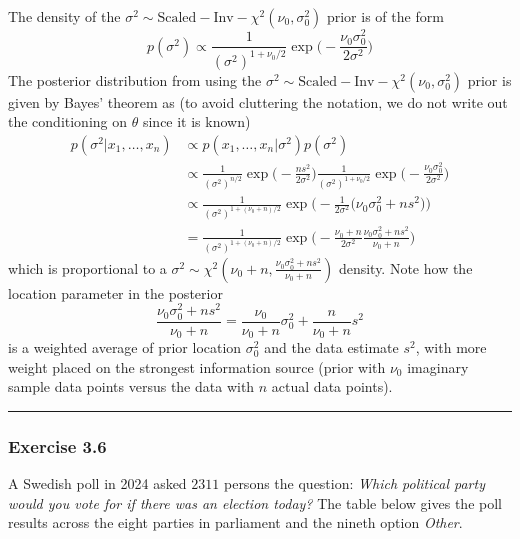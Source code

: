 \documentclass[
  letterpaper,
  DIV=11,
  numbers=noendperiod]{scrartcl}
\begin{document}
\begin{tcolorbox}
The density of the
\(\sigma^2 \sim \mathrm{Scaled-Inv-}\chi^2(\nu_0,\sigma_0^2)\) prior is
of the form \[
p(\sigma^2) \propto \frac{1}{(\sigma^2)^{1+\nu_0/2}}\exp\Big( -\frac{\nu_0\sigma_0^2}{2\sigma^2} \Big)
\] The posterior distribution from using the
\(\sigma^2 \sim \mathrm{Scaled-Inv-}\chi^2(\nu_0,\sigma_0^2)\) prior is
given by Bayes' theorem as (to avoid cluttering the notation, we do not
write out the conditioning on \(\theta\) since it is known) \[
\begin{aligned}
p(\sigma^2 \vert x_1,\ldots,x_n) &\propto 
p(x_1,\ldots,x_n \vert \sigma^2)p(\sigma^2) \\
& \propto  \frac{1}{(\sigma^2)^{n/2}}\exp\Big( -\frac{n s^2}{2\sigma^2}\Big) 
\frac{1}{(\sigma^2)^{1+\nu_0/2}}\exp\Big( -\frac{\nu_0\sigma_0^2}{2\sigma^2} \Big) \\
&\propto \frac{1}{(\sigma^2)^{1+(\nu_0+n)/2}}\exp\Big( -\frac{1}{2\sigma^2}\big( \nu_0 \sigma_0^2 + n s^2 \big)  \Big) \\
&=  \frac{1}{(\sigma^2)^{1+(\nu_0+n)/2}}\exp\Big( -\frac{\nu_0+n}{2\sigma^2}\frac{\nu_0 \sigma_0^2 + n s^2 }{\nu_0+n}  \Big)
\end{aligned}
\] which is proportional to a
\(\sigma^2 \sim \chi^2(\nu_0+n,\frac{\nu_0 \sigma_0^2 + n s^2 }{\nu_0+n})\)
density. Note how the location parameter in the posterior \[
\frac{\nu_0 \sigma_0^2 + n s^2 }{\nu_0+n} = \frac{\nu_0}{\nu_0+n} \sigma_0^2 + \frac{n}{\nu_0+n}s^2
\] is a weighted average of prior location \(\sigma_0^2\) and the data
estimate \(s^2\), with more weight placed on the strongest information
source (prior with \(\nu_0\) imaginary sample data points versus the
data with \(n\) actual data points).

\end{tcolorbox}

\begin{center}\rule{0.5\linewidth}{0.5pt}\end{center}

\subsubsection{Exercise 3.6}\label{exercise-3.6}

A Swedish poll in 2024 asked \(2311\) persons the question:
\textit{Which political party would you vote for if there was an election today?}
The table below gives the poll results across the eight parties in
parliament and the nineth option \textit{Other}. \vspace{0.3cm}
\end{document}
